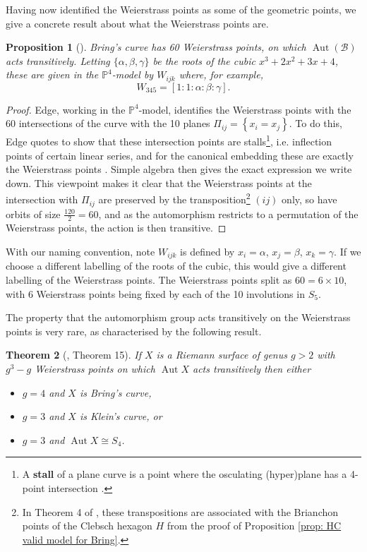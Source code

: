 \documentclass{amsart}
\newtheorem{theorem}{Theorem}[section]
\newtheorem{prop}[theorem]{Proposition}
\newcommand{\bam}[1]{\textbf{#1}}
\DeclareMathOperator{\Aut}{Aut}
\newcommand{\pbrace}[1]{\left\{ #1 \right\} }
\begin{document}
Having now identified the Weierstrass points as some of the geometric points, we give a concrete result about what the Weierstrass points are. 
\begin{prop}[\cite{Edge1978}]\label{WPprop}
Bring's curve has 60 Weierstrass points, on which $\Aut(\mathcal{B})$ acts transitively. Letting $\{ \alpha,\beta,\gamma\}$ be the roots of the cubic $x^3+2x^2+3x+4$, these are given in the $\mathbb{P}^4$-model by $W_{ijk}$ where, for example,
\[
W_{345} = [1:1:\alpha:\beta:\gamma]  . 
\]
\end{prop}
\begin{proof}
Edge, working in the $\mathbb{P}^4$-model, identifies the Weierstrass points with the 60 intersections of the curve with the 10 planes $\Pi_{ij} = \pbrace{ x_i = x_j}$. To do this, Edge quotes \cite{Wiman1895} to show that these intersection points are stalls\footnote{A \bam{stall} of a plane curve is a point where the osculating (hyper)plane has a 4-point intersection \cite{Edge1971}.}, i.e. inflection points of certain linear series, and for the canonical embedding these are exactly the Weierstrass points \cite[p.~37]{Arbarello1985}. Simple algebra then gives the exact expression we write down. This viewpoint makes it clear that the Weierstrass points at the intersection with $\Pi_{ij}$ are preserved by the transposition\footnote{In Theorem 4 of \cite{Dye1995}, these transpositions are associated with the Brianchon points of the Clebsch hexagon $H$ from the proof of Proposition \ref{prop: HC valid model for Bring}.} $(ij)$ only, so have orbits of size $\frac{120}{2}=60$, and as the automorphism restricts to a permutation of the Weierstrass points, the action is then transitive.
\end{proof}
With our naming convention, note $W_{ijk}$ is defined by $x_i=\alpha$, $x_j = \beta$, $x_k = \gamma$. If we choose a different labelling of the roots of the cubic, this would give a different labelling of the Weierstrass points. The Weierstrass points split as $60 = 6 \times 10$, with 6 Weierstrass points being fixed by each of the 10 involutions in $S_5$. 

The property that the automorphism group acts transitively on the Weierstrass points is very rare, as characterised by the following result. 
\begin{theorem}[\cite{Laing2010}, Theorem 15]
If $X$ is a Riemann surface of genus $g>2$ with $g^3-g$ Weierstrass points on which $\Aut X$ acts transitively then either
\begin{itemize}
    \item $g=4$ and $X$ is Bring's curve,
    \item $g=3$ and $X$ is Klein's curve, or
    \item $g=3$ and $\Aut X \cong S_4$. 
\end{itemize}
\end{theorem}
\end{document}
